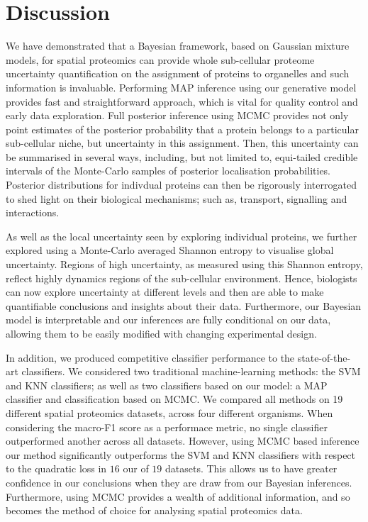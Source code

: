 \documentclass[12pt,english]{article}\usepackage[]{graphicx}\usepackage[]{color}
\begin{document}
\clearpage

\section{Discussion}

We have demonstrated that a Bayesian framework, based on Gaussian
mixture models, for spatial proteomics can provide whole sub-cellular
proteome uncertainty quantification on the assignment of proteins to
organelles and such information is invaluable. Performing MAP
inference using our generative model provides fast and straightforward
approach, which is vital for quality control and early data
exploration. Full posterior inference using MCMC provides not only
point estimates of the posterior probability that a protein belongs to
a particular sub-cellular niche, but uncertainty in this
assignment. Then, this uncertainty can be summarised in several ways,
including, but not limited to, equi-tailed credible intervals of the
Monte-Carlo samples of posterior localisation probabilities.
Posterior distributions for indivdual proteins can then be rigorously
interrogated to shed light on their biological mechanisms; such as,
transport, signalling and interactions.

As well as the local uncertainty seen by exploring individual
proteins, we further explored using a Monte-Carlo averaged Shannon
entropy to visualise global uncertainty. Regions of high uncertainty,
as measured using this Shannon entropy, reflect highly dynamics
regions of the sub-cellular environment.  Hence, biologists can now
explore uncertainty at different levels and then are able to make
quantifiable conclusions and insights about their data.  Furthermore,
our Bayesian model is interpretable and our inferences are fully
conditional on our data, allowing them to be easily modified with
changing experimental design.

In addition, we produced competitive classifier performance to the
state-of-the-art classifiers. We considered two traditional
machine-learning methods: the SVM and KNN classifiers; as well as two
classifiers based on our model: a MAP classifier and classification
based on MCMC. We compared all methods on 19 different spatial
proteomics datasets, across four different organisms. When considering
the macro-F1 score as a performace metric, no single classifier
outperformed another across all datasets. However, using MCMC based
inference our method significantly outperforms the SVM and KNN
classifiers with respect to the quadratic loss in $16$ our of $19$
datasets. This allows us to have greater confidence in our conclusions
when they are draw from our Bayesian inferences. Furthermore, using
MCMC provides a wealth of additional information, and so becomes the
method of choice for analysing spatial proteomics data.
\end{document}
